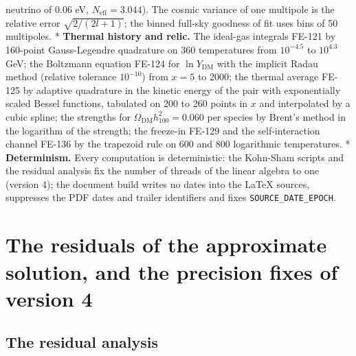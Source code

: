 \documentclass[
  10pt,
]{article}
\begin{document}
neutrino of 0.06 eV, \(N_{\mathrm{eff}} = 3.044\)). The cosmic variance
of one multipole is the relative error \(\sqrt{2/(2l + 1)}\); the binned
full-sky goodness of fit uses bins of 50 multipoles. * \textbf{Thermal
history and relic.} The ideal-gas integrals FE-121 by 160-point
Gauss-Legendre quadrature on 360 temperatures from \(10^{-4.5}\) to
\(10^{4.3}\) GeV; the Boltzmann equation FE-124 for
\(\ln Y_{\mathrm{DM}}\) with the implicit Radau method (relative
tolerance \(10^{-10}\)) from \(x = 5\) to 2000; the thermal average
FE-125 by adaptive quadrature in the kinetic energy of the pair with
exponentially scaled Bessel functions, tabulated on 200 to 260 points in
\(x\) and interpolated by a cubic spline; the strengths for
\(\Omega_{\mathrm{DM}}h_{100}^2 = 0.060\) per species by Brent's method
in the logarithm of the strength; the freeze-in FE-129 and the
self-interaction channel FE-136 by the trapezoid rule on 600 and 800
logarithmic temperatures. * \textbf{Determinism.} Every computation is
deterministic: the Kohn-Sham scripts and the residual analysis fix the
number of threads of the linear algebra to one (version 4); the document
build writes no dates into the LaTeX sources, suppresses the PDF dates
and trailer identifiers and fixes \texttt{SOURCE\_DATE\_EPOCH}.

\hypertarget{the-residuals-of-the-approximate-solution-and-the-precision-fixes-of-version-4}{%
\section{The residuals of the approximate solution, and the precision
fixes of version
4}\label{the-residuals-of-the-approximate-solution-and-the-precision-fixes-of-version-4}}

\hypertarget{the-residual-analysis}{%
\subsection{The residual analysis}\label{the-residual-analysis}}
\end{document}
